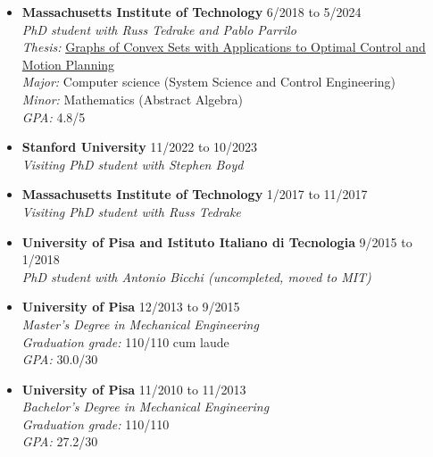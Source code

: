 \documentclass[11pt,a4paper,sans]{moderncv}
\begin{document}
\vspace{5pt}

\begin{itemize}


\item \textbf{Massachusetts Institute of Technology} \hfill 6/2018 to 5/2024 \\
\textit{PhD student with Russ Tedrake and Pablo Parrilo} \\
\textit{Thesis:} \href{http://groups.csail.mit.edu/robotics-center/public_papers/Marcucci24a.pdf}{\color{cyan}Graphs of Convex Sets with Applications to Optimal Control and Motion Planning} \\
\textit{Major:} Computer science (System Science and Control Engineering) \\
\textit{Minor:} Mathematics (Abstract Algebra) \\
\textit{GPA:} 4.8/5

\item \textbf{Stanford University} \hfill 11/2022 to 10/2023 \\
\textit{Visiting PhD student with Stephen Boyd}

\item \textbf{Massachusetts Institute of Technology} \hfill 1/2017 to 11/2017 \\
\textit{Visiting PhD student with Russ Tedrake}

\item \textbf{University of Pisa and Istituto Italiano di Tecnologia} \hfill 9/2015 to 1/2018 \\
\textit{PhD student with Antonio Bicchi (uncompleted, moved to MIT)}

\item \textbf{University of Pisa} \hfill 12/2013 to 9/2015 \\
\textit{Master's Degree in Mechanical Engineering} \\
\textit{Graduation grade:} 110/110 cum laude \\
\textit{GPA:} 30.0/30

\item \textbf{University of Pisa} \hfill 11/2010 to 11/2013 \\
\textit{Bachelor's Degree in Mechanical Engineering} \\
\textit{Graduation grade:} 110/110 \\
\textit{GPA:} 27.2/30

\end{itemize}
\end{document}
